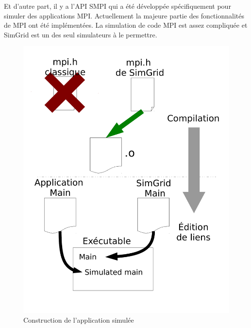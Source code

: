 \documentclass[smallextended]{svjour3}
\begin{document}
Et d'autre part, il y a l'API SMPI qui a été développée
spécifiquement pour simuler des applications MPI. Actuellement la
majeure partie des fonctionnalités de MPI ont été implémentées. La
simulation de code MPI est assez compliquée et SimGrid est un des
seul simulateurs à le permettre. 
\begin{figure}[htb]
  \centering
  \begin{minipage}{.45\linewidth}
    \includegraphics[width=\linewidth]{./Img/Compile.pdf}
    \caption{\label{fig:2}Construction de l'application simulée}
  \end{minipage}
  \begin{minipage}{.45\linewidth}

\end{minipage}
\end{figure}
\end{document}
